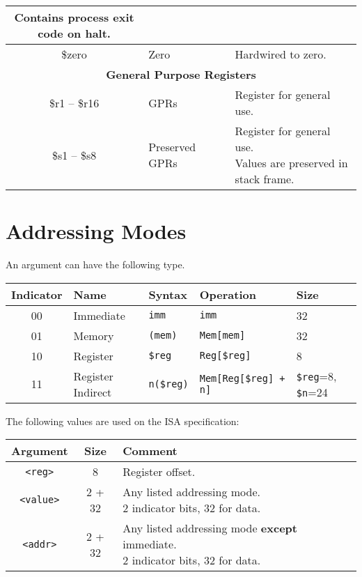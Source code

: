 \documentclass{article}
\begin{document}
\begin{longtable}{|c|l|l|l|}
{    Contains process exit code on halt.} \\
    \hline
    \$zero & Zero & & Hardwired to zero. \\
    \hline \hline
    \multicolumn{4}{|c|}{\textbf{General Purpose Registers}} \\
    \hline
    \$r1 -- \$r16 & GPRs &  & Register for general use. \\
    \hline
    \$s1 -- \$s8 & Preserved GPRs &  & \makecell[l]{Register for general use.\\Values are preserved in stack frame.} \\
    \hline
\end{longtable}

\section{Addressing Modes}

An argument can have the following type.

\medskip
\begin{tabular}{|c|l|l|l|l|}
    \hline
    \textbf{Indicator} & \textbf{Name} & \textbf{Syntax} & \textbf{Operation} & \textbf{Size} \\
    \hline
    00 & Immediate & \texttt{imm} & \texttt{imm} & 32 \\
    01 & Memory & \texttt{(mem)} & \texttt{Mem[mem]} & 32\\
    10 & Register & \texttt{\$reg} & \texttt{Reg[\$reg]} & 8 \\ 
    11 & Register Indirect & \texttt{n(\$reg)} & \texttt{Mem[Reg[\$reg] + n]} & \texttt{\$reg}=8, \texttt{\$n}=24 \\
    \hline
\end{tabular}

\bigskip
The following values are used on the ISA specification:
\medskip

\begin{tabular}{|c|c|l|}
    \hline
    \textbf{Argument} & \textbf{Size} & \textbf{Comment} \\
    \hline
    \texttt{<reg>} & 8 & Register offset. \\
    \hline
    \texttt{<value>} & 2 + 32 & \makecell[l]{Any listed addressing mode.\\%
    2 indicator bits, 32 for data.} \\
    \hline
    \texttt{<addr>} & 2 + 32 & \makecell[l]{Any listed addressing mode \textbf{except} immediate.\\%
    2 indicator bits, 32 for data.} \\
    \hline
\end{tabular}
\end{document}
